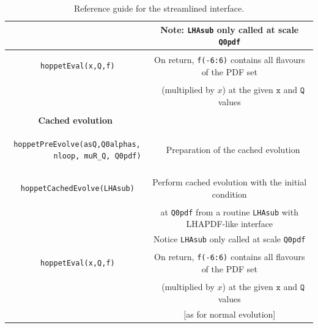 \documentclass[12pt]{article}
\newcommand{\ttt}[1]{\texttt{#1}}
\newcommand{\fn}{\scriptsize}
\begin{document}
\begin{table}
\begin{center}
\begin{tabular}{|c|c|}
&  \fn Note:  \ttt{LHAsub} only called at scale \ttt{Q0pdf}\\
\hline
\begin{lstlisting}
 hoppetEval(x,Q,f)
\end{lstlisting} &
\fn On return, \ttt{f(-6:6)} contains all flavours of the PDF set\\ 
& \fn ~
(multiplied by $x$) at the given $\ttt{x}$ and $\ttt{Q}$ values \\
\hline&\\[-0.5em]
\bf Cached evolution & \\
\hline
\begin{lstlisting}
 hoppetPreEvolve(asQ,Q0alphas, 
          nloop, muR_Q, Q0pdf)
\end{lstlisting} & \fn ~
 Preparation of the cached evolution\\
\hline
\begin{lstlisting}
 hoppetCachedEvolve(LHAsub)
\end{lstlisting} &
\fn  Perform cached evolution with the initial condition\\
& \fn at \ttt{Q0pdf} from a routine \ttt{LHAsub} 
with LHAPDF-like interface\\
&  \fn Notice  \ttt{LHAsub} only called at scale \ttt{Q0pdf}\\
\hline
\begin{lstlisting}
 hoppetEval(x,Q,f)
\end{lstlisting} &
\fn On return, \ttt{f(-6:6)} contains all flavours of the PDF set\\ 
& \fn ~
(multiplied by $x$) at the given $\ttt{x}$ and $\ttt{Q}$ values \\
& \fn [as for normal evolution]\\
\hline
\end{tabular}
\end{center}
\caption{\label{tab:streamlined} Reference guide for the streamlined interface.}
\end{table}




% 
% 
% 
\end{document}
